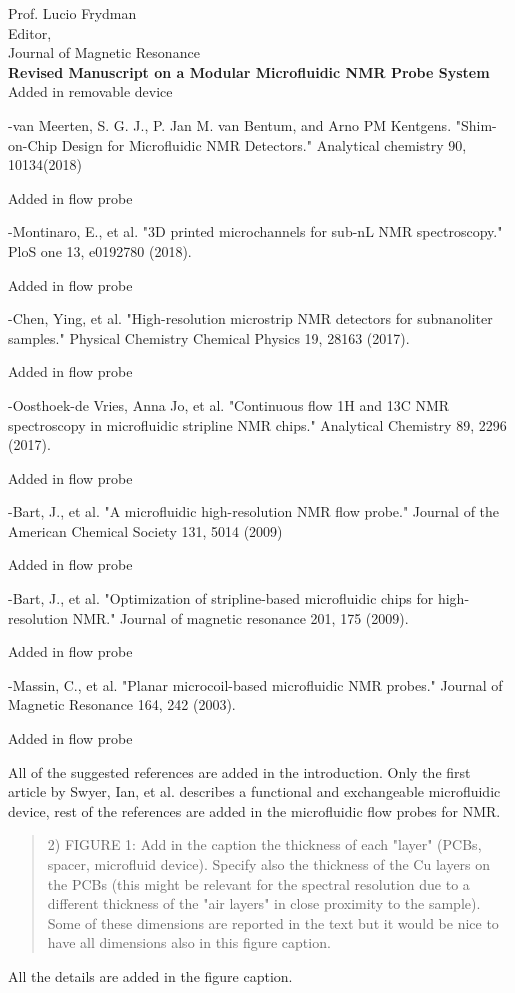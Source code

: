 \documentclass{mu-soton-letter}
\newenvironment{reviewer} {\begin{quote}\color{black!50}} {\end{quote}}
\begin{document}
\begin{letter}{Prof. Lucio Frydman\\
  Editor,\\
  Journal of Magnetic Resonance\\[2cm]
  \textbf{Revised Manuscript on a Modular Microfluidic NMR Probe System}}
Added in removable device

-van Meerten, S. G. J., P. Jan M. van Bentum, and Arno PM Kentgens. "Shim-on-Chip Design for Microfluidic NMR Detectors." Analytical chemistry 90, 10134(2018)

Added in flow probe

-Montinaro, E., et al. "3D printed microchannels for sub-nL NMR spectroscopy." PloS one 13, e0192780 (2018).

Added in flow probe

-Chen, Ying, et al. "High-resolution microstrip NMR detectors for subnanoliter samples." Physical Chemistry Chemical Physics 19, 28163 (2017).

Added in flow probe

-Oosthoek-de Vries, Anna Jo, et al. "Continuous flow 1H and 13C NMR spectroscopy in microfluidic stripline NMR chips." Analytical Chemistry 89,  2296 (2017).

Added in flow probe

-Bart, J., et al. "A microfluidic high-resolution NMR flow probe." Journal of the American Chemical Society 131, 5014 (2009)

Added in flow probe

-Bart, J., et al. "Optimization of stripline-based microfluidic chips for high-resolution NMR." Journal of magnetic resonance 201, 175 (2009).

Added in flow probe

-Massin, C., et al. "Planar microcoil-based microfluidic NMR probes." Journal of Magnetic Resonance 164, 242 (2003).

Added in flow probe

All of the suggested references are added in the introduction. Only the first article by Swyer, Ian, et al. describes a functional and exchangeable microfluidic device, rest of the references are added in the microfluidic flow probes for NMR.

\begin{reviewer}
2) FIGURE 1: Add in the caption the thickness of each "layer" (PCBs, spacer, microfluid device). Specify also the thickness of the Cu layers on the PCBs (this might be relevant for the spectral resolution due to a different thickness of the "air layers" in close proximity to the sample). Some of these dimensions are reported in the text but it would be nice to have all dimensions also in this figure caption.
\end{reviewer}
All the details are added in the figure caption.


\end{letter}
\end{document}
